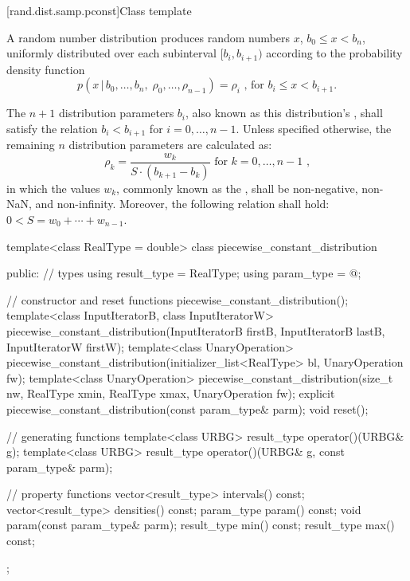 [rand.dist.samp.pconst]{Class template }%
%
%

\pnum
A  random number distribution
produces random numbers $x$,
$b_0 \leq x < b_n$,
uniformly distributed over each subinterval
$[ b_i, b_{i+1} )$
according to the probability density function
%
%
\[ p(x \,|\, b_0, \dotsc, b_n, \; \rho_0, \dotsc, \rho_{n-1}) = \rho_i
   \text{ , for $b_i \le x < b_{i+1}$.} \]

\pnum
The $n + 1$ distribution parameters $b_i$,
also known as this distribution's %
%
%
, shall satisfy the relation
$b_i < b_{i + 1}$ for $i = 0, \dotsc, n - 1$.
Unless specified otherwise,
the remaining $n$ distribution parameters are calculated as:
\[ \rho_k = \frac{w_k}{S \cdot (b_{k+1}-b_k)} \text{ for } k = 0, \dotsc, n - 1 \text{ ,} \]
in which the values $w_k$,
commonly known as the %
%
%
, shall be non-negative, non-NaN, and non-infinity.
Moreover, the following relation shall hold:
 $0 < S = w_0 + \dotsb + w_{n-1}$.

%
\begin{codeblock}
template<class RealType = double>
  class piecewise_constant_distribution {
  public:
    // types
    using result_type = RealType;
    using param_type  = @\unspec@;

    // constructor and reset functions
    piecewise_constant_distribution();
    template<class InputIteratorB, class InputIteratorW>
      piecewise_constant_distribution(InputIteratorB firstB, InputIteratorB lastB,
                                      InputIteratorW firstW);
    template<class UnaryOperation>
      piecewise_constant_distribution(initializer_list<RealType> bl, UnaryOperation fw);
    template<class UnaryOperation>
      piecewise_constant_distribution(size_t nw, RealType xmin, RealType xmax,
                                      UnaryOperation fw);
    explicit piecewise_constant_distribution(const param_type& parm);
    void reset();

    // generating functions
    template<class URBG>
      result_type operator()(URBG& g);
    template<class URBG>
      result_type operator()(URBG& g, const param_type& parm);

    // property functions
    vector<result_type> intervals() const;
    vector<result_type> densities() const;
    param_type param() const;
    void param(const param_type& parm);
    result_type min() const;
    result_type max() const;
  };
\end{codeblock}


